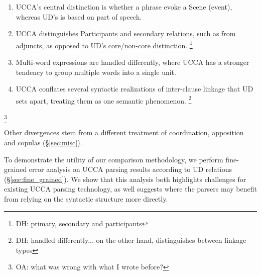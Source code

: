 \documentclass[11pt,a4paper]{article}
\newcommand{\oa}[1]{\footnote{\color{red}OA: #1}}
\newcommand{\daniel}[1]{\footnote{\color{blue}DH: #1}}
\begin{document}
  \begin{enumerate}[noitemsep]
      \item UCCA's central distinction is whether a phrase evoke a Scene (event),
        whereas UD's is based on part of speech. %
      \item UCCA distinguishes Participants and secondary relations, such
        as  from adjuncts, as opposed to UD's core/non-core distinction. %
        \daniel{primary, secondary and participants}
      \item Multi-word expressions are handled differently,
        where UCCA has a stronger tendency to group multiple 
        words into a single unit. %
      \item UCCA conflates several syntactic realizations of inter-clause linkage that UD sets apart,
        treating them as one semantic phenomenon. %
        \daniel{handled differently... on the other hand, distinguishes between linkage types}
   \end{enumerate}
    
  \oa{what was wrong with what I wrote before?}
    
   Other divergences stem from a different treatment of coordination, apposition and copulas (\S\ref{sec:misc}).
  

  To demonstrate the utility of our comparison methodology,
  we perform fine-grained error analysis on UCCA parsing results
  according to UD relations (\S\ref{sec:fine_grained}).
  We show that this analysis both highlights challenges for existing UCCA parsing technology,
  as well suggests where the parsers may benefit from relying on the syntactic structure more directly.

\end{document}
